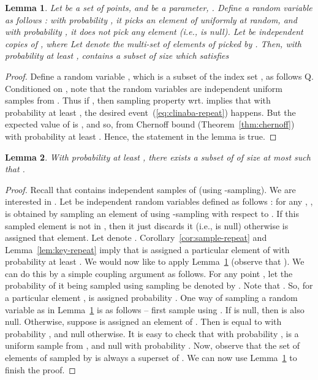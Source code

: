 \documentclass[11pt]{article}
\newtheorem{lemma}{Lemma}
\begin{document}
\begin{lemma}
\label{lem:clinaba-repeat}
Let  be a set of  points, and  be a parameter, . Define a random variable  as follows :
with probability , it picks an element of  uniformly at random, and with  probability , it does not
pick any element (i.e., is null). 
Let  be  independent copies of , where 
Let  denote the multi-set of elements of  picked by . Then, with probability at least ,
 contains a subset  of size  which satisfies

\end{lemma}
\begin{proof}
Define a random variable , which is a subset of the index set , as follows
Q. 
Conditioned on , note that the random variables  are independent uniform samples from . 
Thus if , then sampling property wrt.  implies that with probability at least , the desired event~(\ref{eq:clinaba-repeat}) happens. 
But the expected value of  is , and so, from Chernoff bound (Theorem~\ref{thm:chernoff})  with probability at least . 
Hence, the statement in the lemma is true.
\end{proof}

\begin{lemma}
\label{lem:final-repeat}
With probability at least , there exists a subset  of  of size at most  such that
.
\end{lemma}
\begin{proof}
Recall that  contains  independent samples of  (using -sampling). 
We are interested in .
Let  be   independent random variables defined as follows : 
for any , ,  is obtained by sampling an element of  using -sampling with respect to . 
If this sampled element is not in , then it just discards it (i.e.,  is null) otherwise  is assigned that element.
Let  denote . 
Corollary~\ref{cor:sample-repeat} and Lemma~\ref{lem:key-repeat} imply that  is assigned a particular element of  with probability at least . 
We would now like to apply Lemma~\ref{lem:clinaba-repeat} (observe that ). 
We can do this by a simple coupling argument as follows.
For any point , let the probability of it being sampled using  sampling be denoted by .
Note that .
So, for a particular element ,  is assigned  probability .
One way of sampling a random variable  as in Lemma~\ref{lem:clinaba-repeat} is as follows --  first sample using . 
If  is null, then  is also null. 
Otherwise, suppose  is assigned an element  of . 
Then  is equal to  with probability , and null otherwise. 
It is easy to check that with probability ,  is a uniform sample from , and null with probability . 
Now, observe that the set of elements of  sampled by  is always a superset of . 
We can now use Lemma~\ref{lem:clinaba-repeat} to finish the proof.
\end{proof}
\end{document}
